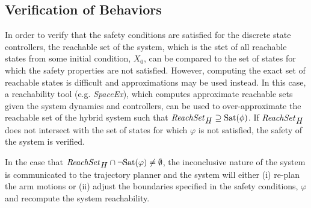 \subsection{Verification of Behaviors}
In order to verify that the safety conditions are satisfied for the discrete state controllers, the reachable set of the system, which is the stet of all reachable states from some initial condition, $X_0$, can be compared to the set of states for which the safety properties are not satisfied.
However, computing the exact set of reachable states is difficult \cite{Henzinger:1995:WDH:225058.225162} and approximations may be used instead.
In this case, a reachability tool (e.g. \textit{SpaceEx}), which computes approximate reachable sets given the system dynamics and controllers, can be used to over-approximate the reachable set of the hybrid system such that $\mbox{\textit{ReachSet}}_{\mbox{\textit{H}}} \supseteq \mbox{Sat}(\phi)$.
If $\mbox{\textit{ReachSet}}_{\mbox{\textit{H}}}$ does not intersect with the set of states for which $\varphi$ is not satisfied, the safety of the system is verified.

In the case that $\mbox{\textit{ReachSet}}_{\mbox{\textit{H}}} \cap \neg \mbox{Sat}(\varphi) \neq \emptyset$, the inconclusive nature of the system is communicated to the trajectory planner and the system will either (i) re-plan the arm motions or (ii) adjust the boundaries specified in the safety conditions, $\varphi$ and recompute the system reachability.


